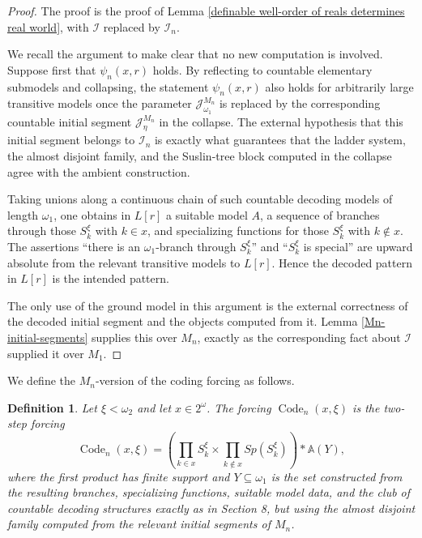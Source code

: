 \documentclass[a4paper,11pt]{article}
\newtheorem{definition}[theorem]{Definition}
\begin{document}
\begin{proof}
The proof is the proof of Lemma
\ref{definable well-order of reals determines real world}, with
$\mathcal I$ replaced by $\mathcal I_n$.

We recall the argument to make clear that no new computation is involved.
Suppose first that $\psi_n(x,r)$ holds. By reflecting to countable elementary
submodels and collapsing, the statement $\psi_n(x,r)$ also holds for
arbitrarily large transitive models once the parameter
$\mathcal J^{M_n}_{\omega_1}$ is replaced by the corresponding countable
initial segment $\mathcal J^{M_n}_{\eta}$ in the collapse. The external
hypothesis that this initial segment belongs to $\mathcal I_n$ is exactly
what guarantees that the ladder system, the almost disjoint family, and the
Suslin-tree block computed in the collapse agree with the ambient
construction.

Taking unions along a continuous chain of such countable decoding models of
length $\omega_1$, one obtains in $L[r]$ a suitable model $A$, a sequence of
branches through those $S^\xi_k$ with $k\in x$, and specializing functions
for those $S^\xi_k$ with $k\notin x$. The assertions ``there is an
$\omega_1$-branch through $S^\xi_k$'' and ``$S^\xi_k$ is special'' are upward
absolute from the relevant transitive models to $L[r]$. Hence the decoded
pattern in $L[r]$ is the intended pattern.

The only use of the ground model in this argument is the external correctness
of the decoded initial segment and the objects computed from it. Lemma
\ref{Mn-initial-segments} supplies this over $M_n$, exactly as the
corresponding fact about $\mathcal I$ supplied it over $M_1$.
\end{proof}

We define the $M_n$-version of the coding forcing as follows.

\begin{definition}\label{Mn-Code-definition}
Let $\xi<\omega_2$ and let $x\in 2^\omega$. The forcing
$\operatorname{Code}_n(x,\xi)$ is the two-step forcing
\[
\operatorname{Code}_n(x,\xi)=
\left(
\prod_{k\in x} S^\xi_k
\times
\prod_{k\notin x} Sp(S^\xi_k)
\right)
\ast
\mathbb A(Y),
\]
where the first product has finite support and $Y\subseteq\omega_1$ is the
set constructed from the resulting branches, specializing functions, suitable
model data, and the club of countable decoding structures exactly as in
Section 8, but using the almost disjoint family computed from the relevant
initial segments of $M_n$.
\end{definition}
\end{document}
